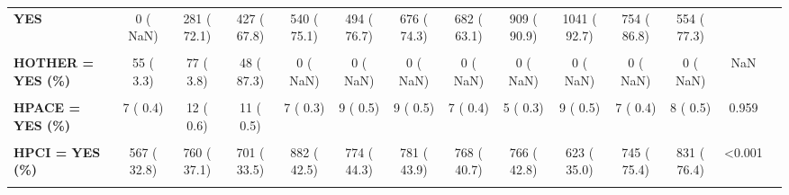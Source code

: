 \documentclass[
]{article}
\begin{document}
\begin{table}[H]
\begin{tabular}[t]{>{\raggedright\arraybackslash}p{5em}ccccccccccccc}
\textbf{YES} & 0 (  NaN) & 281 ( 72.1) & 427 ( 67.8) & 540 ( 75.1) & 494 ( 76.7) & 676 ( 74.3) & 682 ( 63.1) & 909 ( 90.9) & 1041 ( 92.7) & 754 ( 86.8) & 554 ( 77.3) &  & \\
\textbf{\cellcolor{gray!10}{HOSWBC (mean (SD))}} & \cellcolor{gray!10}{NaN (NA)} & \cellcolor{gray!10}{NaN (NA)} & \cellcolor{gray!10}{11176.41 (4387.76)} & \cellcolor{gray!10}{NaN (NA)} & \cellcolor{gray!10}{6164.86 (7310.90)} & \cellcolor{gray!10}{10955.50 (4324.96)} & \cellcolor{gray!10}{1904633.63 (7342801.22)} & \cellcolor{gray!10}{120.94 (1037.82)} & \cellcolor{gray!10}{10.32 (4.45)} & \cellcolor{gray!10}{10.49 (4.20)} & \cellcolor{gray!10}{10.18 (3.78)} & \cellcolor{gray!10}{<0.001} & \cellcolor{gray!10}{}\\
\textbf{HOTHER = YES (\%)} & 55 (  3.3) & 77 (  3.8) & 48 ( 87.3) & 0 (  NaN) & 0 (  NaN) & 0 (  NaN) & 0 (  NaN) & 0 (  NaN) & 0 (  NaN) & 0 (  NaN) & 0 (  NaN) & NaN & \\
\textbf{\cellcolor{gray!10}{HP2Y12 = YES (\%)}} & \cellcolor{gray!10}{0 (  NaN)} & \cellcolor{gray!10}{0 (  NaN)} & \cellcolor{gray!10}{0 (  NaN)} & \cellcolor{gray!10}{0 (  NaN)} & \cellcolor{gray!10}{1540 ( 88.8)} & \cellcolor{gray!10}{1684 ( 94.7)} & \cellcolor{gray!10}{1797 ( 95.4)} & \cellcolor{gray!10}{1622 ( 90.7)} & \cellcolor{gray!10}{1658 ( 98.1)} & \cellcolor{gray!10}{1470 ( 84.0)} & \cellcolor{gray!10}{1219 ( 69.5)} & \cellcolor{gray!10}{NaN} & \cellcolor{gray!10}{}\\
\textbf{HPACE = YES (\%)} & 7 (  0.4) & 12 (  0.6) & 11 (  0.5) & 7 (  0.3) & 9 (  0.5) & 9 (  0.5) & 7 (  0.4) & 5 (  0.3) & 9 (  0.5) & 7 (  0.4) & 8 (  0.5) & 0.959 & \\
\textbf{\cellcolor{gray!10}{HPC2BS = DURING/AFTER PCI (\%)}} & \cellcolor{gray!10}{0 (  NaN)} & \cellcolor{gray!10}{0 (  NaN)} & \cellcolor{gray!10}{0 (  NaN)} & \cellcolor{gray!10}{146 ( 45.1)} & \cellcolor{gray!10}{154 ( 60.9)} & \cellcolor{gray!10}{109 ( 64.1)} & \cellcolor{gray!10}{81 ( 82.7)} & \cellcolor{gray!10}{0 (  NaN)} & \cellcolor{gray!10}{0 (  NaN)} & \cellcolor{gray!10}{0 (  NaN)} & \cellcolor{gray!10}{0 (  NaN)} & \cellcolor{gray!10}{NaN} & \cellcolor{gray!10}{}\\
\textbf{HPCI = YES (\%)} & 567 ( 32.8) & 760 ( 37.1) & 701 ( 33.5) & 882 ( 42.5) & 774 ( 44.3) & 781 ( 43.9) & 768 ( 40.7) & 766 ( 42.8) & 623 ( 35.0) & 745 ( 75.4) & 831 ( 76.4) & <0.001 & \\
\textbf{\cellcolor{gray!10}{HPCIAN = YES (\%)}} & \cellcolor{gray!10}{0 (  NaN)} & \cellcolor{gray!10}{0 (  NaN)} & \cellcolor{gray!10}{0 (  NaN)} & \cellcolor{gray!10}{45 (  2.2)} & \cellcolor{gray!10}{74 (  9.6)} & \cellcolor{gray!10}{39 (  5.0)} & \cellcolor{gray!10}{0 (  NaN)} & \cellcolor{gray!10}{0 (  NaN)} & \cellcolor{gray!10}{0 (  NaN)} & \cellcolor{gray!10}{0 (  NaN)} & \cellcolor{gray!10}{0 (  NaN)} & \cellcolor{gray!10}{NaN} & \cellcolor{gray!10}{}\\

\end{tabular}
\end{table}
\end{document}
